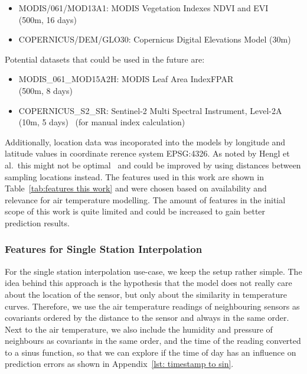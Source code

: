 \begin{itemize}
    \item MODIS/061/MOD13A1: MODIS Vegetation Indexes NDVI and EVI\\
    (500m, 16 days)~\cite{didan2021modis}
    \item COPERNICUS/DEM/GLO30: Copernicus Digital Elevations Model (30m)~\cite{copernicus30dem}
\end{itemize}

Potential datasets that could be used in the future are:

\begin{itemize}
    \item MODIS\_061\_MOD15A2H: MODIS Leaf Area Index\/FPAR \\
    (500m, 8 days)~\cite{myneni2021modis}
    \item COPERNICUS\_S2\_SR: Sentinel-2 Multi Spectral Instrument, Level-2A\\
    (10m, 5 days)~\cite{sentinel2msi} (for manual index calculation)
\end{itemize}

Additionally, location data was incoporated into the models by longitude and latitude values in coordinate rerence system EPSG:4326. As noted by Hengl et al.\ this might not be optimal~\cite{hengl2018random} and could be improved by using distances between sampling locations instead. The features used in this work are shown in Table~\ref{tab:features this work} and were chosen based on availability and relevance for air temperature modelling. The amount of features in the initial scope of this work is quite limited and could be increased to gain better prediction results.

\subsubsection{Features for Single Station Interpolation}

For the single station interpolation use-case, we keep the setup rather simple. The idea behind this approach is the hypothesis that the model does not really care about the location of the sensor, but only about the similarity in temperature curves. Therefore, we use the air temperature readings of neighbouring sensors as covariants ordered by the distance to the sensor and always in the same order. Next to the air temperature, we also include the humidity and pressure of neighbours as covariants in the same order, and the time of the reading converted to a sinus function, so that we can explore if the time of day has an influence on prediction errors as shown in Appendix~\ref{lst: timestamp to sin}.

